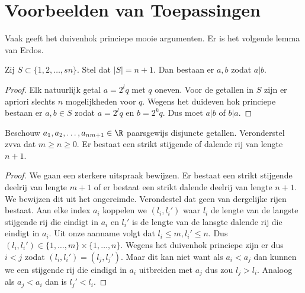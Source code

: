 \section{Voorbeelden van Toepassingen} \label{sec:voorbeelden_van_toepassingen}
Vaak geeft het duivenhok princiepe mooie argumenten.
Er is het volgende lemma van Erdos.
\begin{lemma}
	Zij $S \subset \{1, 2, \ldots, sn\} $. Stel dat $|S| = n+1$. Dan bestaan er $a, b$ zodat $a |b$.
\end{lemma}
\begin{proof}
	Elk natuurlijk getal $a =2^{l}q$ met $q $ oneven. Voor de getallen in $S$ zijn er apriori slechts $n$ mogelijkheden voor $q$. 
	Wegens het duideven hok princiepe bestaan er $a, b \in S$ zodat $a = 2^l q$ en  $b = 2^k q$. 
	Dus moet  $a | b$ of $b | a$. 
\end{proof}
\begin{lemma}
	Beschouw $a_1, a_2, \ldots, a_{nm + 1} \in \R$ paarsgewijs disjuncte getallen. Veronderstel zvva dat $m \ge n\ge 0$. 
	Er bestaat een strikt stijgende of dalende rij van lengte  $n+1$.
\end{lemma}
\begin{proof}
	We gaan een sterkere uitspraak bewijzen. Er bestaat een strikt stijgende deelrij van lengte $m+1$ of er bestaat een strikt dalende deelrij van lengte  $n + 1$.
	We bewijzen dit uit het ongereimde. 
	Verondestel dat geen van dergelijke rijen bestaat.
	Aan elke index $a_i$ koppelen we $(l_i, l_i')$ waar  $l_i$ de lengte van de langste stijgende rij die eindigt in  $a_i$ en $l_i'$ is de lengte van de lansgte dalende rij die eindigt in $a_i$.
	Uit onze aanname volgt dat  $l_i \le m, l_i' \le  n$. Dus  $(l_i, l_i') \in \{1,\ldots,m\} \times \{1, \ldots, n\} $. 
	Wegens het duivenhok princiepe zijn er dus $i < j$ zodat $(l_i, l_i') = (l_j, l_j')$. 
Maar dit kan niet want als  $a_i < a_j$ dan kunnen we een stijgende rij die eindigd in  $a_i$ uitbreiden met  $a_j$ dus zou $l_j > l_i$. Analoog als  $a_j < a_i$ dan is $l_j' < l_i$. 
\end{proof}

